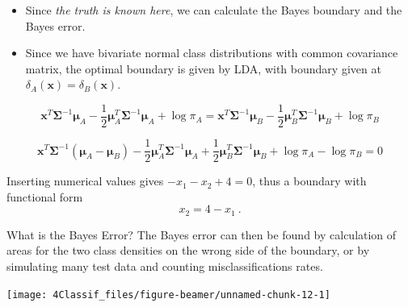 \documentclass[
  10pt,
  ignorenonframetext,
]{beamer}
\begin{document}
\begin{frame}
\begin{itemize}
\item
  Since \emph{the truth is known here}, we can calculate the Bayes
  boundary and the Bayes error.
\item
  Since we have bivariate normal class distributions with common
  covariance matrix, the optimal boundary is given by LDA, with boundary
  given at \(\delta_A({\boldsymbol x})=\delta_B({\boldsymbol x})\).
\end{itemize}

\[{\boldsymbol x}^T \boldsymbol{\Sigma}^{-1}\boldsymbol\mu_A - \frac{1}{2}\boldsymbol\mu_A^T \boldsymbol{\Sigma}^{-1}\boldsymbol\mu_A + \log \pi_A={\boldsymbol x}^T \boldsymbol{\Sigma}^{-1}\boldsymbol\mu_B - \frac{1}{2}\boldsymbol\mu_B^T \boldsymbol{\Sigma}^{-1}\boldsymbol\mu_B + \log \pi_B\]

\[{\boldsymbol x}^T\boldsymbol{\Sigma}^{-1}(\boldsymbol\mu_A -\boldsymbol\mu_B)-\frac{1}{2}\boldsymbol\mu_A^T \boldsymbol{\Sigma}^{-1}\boldsymbol\mu_A +\frac{1}{2}\boldsymbol\mu_B^T \boldsymbol{\Sigma}^{-1}\boldsymbol\mu_B +\log \pi_A-\log \pi_B=0\]

Inserting numerical values gives \(-x_1-x_2+4=0\), thus a boundary with
functional form \[x_2=4-x_1 \ .\]
\end{frame}

\begin{frame}
\begin{block}{What is the Bayes Error?}
\protect\hypertarget{what-is-the-bayes-error}{}
The Bayes error can then be found by calculation of areas for the two
class densities on the wrong side of the boundary, or by simulating many
test data and counting misclassifications rates.

\begin{center}\texttt{[image: 4Classif\_files/figure-beamer/unnamed-chunk-12-1]} \end{center}
\end{block}
\end{frame}
\end{document}
